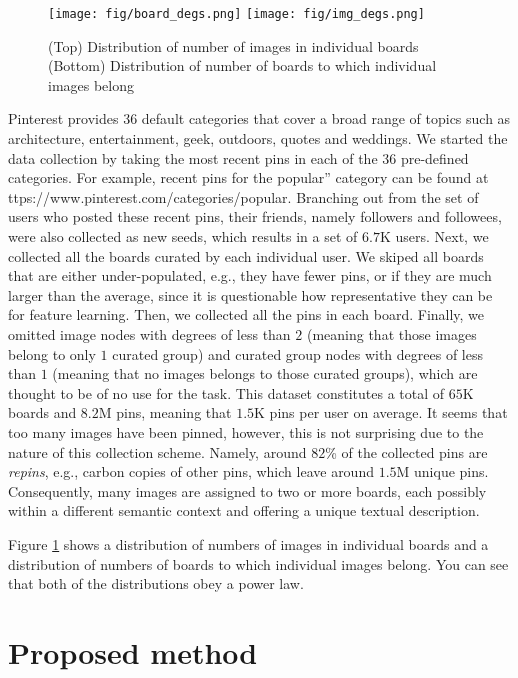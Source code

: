\documentclass[letterpaper]{article} %
\begin{document}
\begin{figure}[t]
  \centering
  \texttt{[image: fig/board\_degs.png]}
  \texttt{[image: fig/img\_degs.png]}
  \caption{%
    (Top)    Distribution of number of images in individual boards
    (Bottom) Distribution of number of boards to which individual images belong
  }
  \label{fig:degs}
\end{figure}

Pinterest provides 36 default categories that cover a broad range of topics such as architecture, entertainment, geek, outdoors, quotes and weddings.
%
We started the data collection by taking the most recent pins in each of the 36 pre-defined categories.
%
For example, recent pins for the popular” category can be found at ttps://www.pinterest.com/categories/popular. %
%
Branching out from the set of users who posted these recent pins, their friends, namely followers and followees, were also collected as new seeds, which results in a set of $6.7$K users.
%
Next, we collected all the boards curated by each individual user.
%
We skiped all boards that are either under-populated, e.g., they have fewer pins, or if they are much larger than the average, since it is questionable how representative they can be for feature learning.
%
Then, we collected all the pins in each board.
%
Finally, we omitted image nodes with degrees of less than $2$ (meaning that those images belong to only $1$ curated group) and curated group nodes with degrees of less than $1$ (meaning that no images belongs to those curated groups), which are thought to be of no use for the task.
%
This dataset constitutes a total of $65$K boards and $8.2$M pins, meaning that $1.5$K pins per user on average.
%
It seems that too many images have been pinned, however, this is not surprising due to the nature of this collection scheme.
%
Namely, around $82$\% of the collected pins are \emph{repins}, e.g., carbon copies of other pins, which leave around $1.5$M unique pins.
%
Consequently, many images are assigned to two or more boards, each possibly within a different semantic context and offering a unique textual description.

Figure \ref{fig:degs} shows a distribution of numbers of images in individual boards and a distribution of numbers of boards to which individual images belong.
%
You can see that both of the distributions obey a power law.


\section{Proposed method}
\label{sec:proposed}
\end{document}
